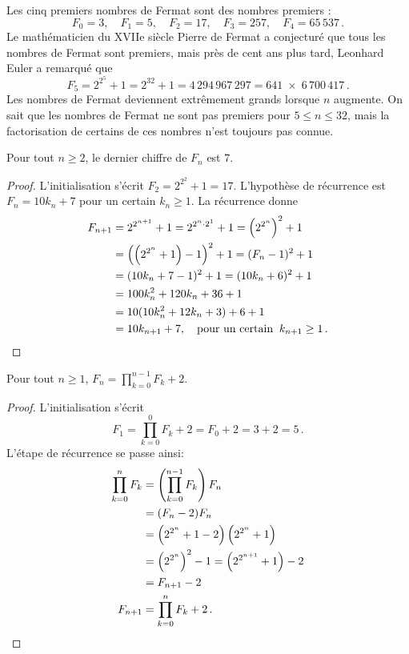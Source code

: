 Les cinq premiers nombres de Fermat sont des nombres premiers :
\[
F_0=3,\quad F_1=5,\quad F_2=17,\quad F_3=257,\quad F_4=65\,537\,.
\]
Le mathématicien du XVIIe siècle Pierre de Fermat a conjecturé que tous les nombres de Fermat sont premiers, mais près de cent ans plus tard, Leonhard Euler a remarqué que
\[F_5=2^{2^5}+1 = 2^{32}+1 = 4\,294\,967\,297 = 641 \;\times\; 6\,700\,417\,.\]
Les nombres de Fermat deviennent extrêmement grands lorsque $n$ augmente. On sait que les nombres de Fermat ne sont pas premiers pour $5\leq n \leq 32$, mais la factorisation de certains de ces nombres n'est toujours pas connue.

\begin{theorem}
Pour tout $n\geq 2$, le dernier chiffre de $F_n$ est $7$.
\end{theorem}
\begin{proof}
L'initialisation s'écrit $F_2=2^{2^2}+1=17$.
L'hypothèse de récurrence est $F_n=10k_n+7$ pour un certain $k_n\geq 1$. La récurrence donne
\begin{align*}
F_{n+1}&=2^{2^{n+1}}+1=2^{2^{n}\cdot 2^1}+1=\left(2^{2^{n}}\right)^2+1\\
&=\left(\left(2^{2^{n}}+1\right)-1\right)^2+1=(F_n-1)^2+1\\
&=(10k_n+7-1)^2+1=(10k_n+6)^2+1\\
&=100k_n^2+120k_n+36+1\\
&=10(10k_n^2+12k_n+3)+6+1\\
&=10k_{n+1}+7,\quad \textrm{pour un certain} \;\;k_{n+1}\geq 1\,.\qedhere
\end{align*}
\end{proof}


\begin{theorem}
Pour tout $n\geq 1$, $\displaystyle F_n = \prod_{k=0}^{n-1} F_k + 2$.
\end{theorem}
\begin{proof}
L'initialisation s'écrit
\[
F_1=\prod_{k=0}^{0} F_k + 2=F_0+2=3+2=5\,.
\]
L'étape de récurrence se passe ainsi:
\begin{align*}
\prod_{k=0}^{n}F_k&=\left(\prod_{k=0}^{n-1}F_k\right) F_n \\
&=(F_n-2)F_n\\
&= \left(2^{2^n}+1-2\right)\left(2^{2^n}+1\right)\\
&= \left(2^{2^{n}}\right)^2-1= \left(2^{2^{n+1}}+1\right)-2\\
&=F_{n+1}-2\\
F_{n+1}&=\prod_{k=0}^{n}F_k + 2\,. \qedhere
\end{align*}
\end{proof}


